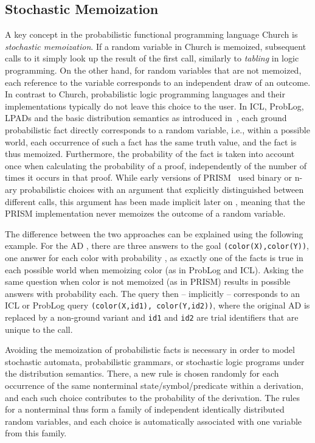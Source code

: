 \documentclass[a4paper]{article}
\begin{document}
\subsection{Stochastic Memoization}
\label{sec:repeat}
A key concept in the probabilistic functional programming language
Church \citep{Goodman08} is \emph{stochastic memoization}. If a random
variable in Church is memoized, subsequent calls to it simply look up
the result of the first call, similarly to \emph{tabling} in logic
programming. On the other hand, for random variables that are not
memoized, each reference to the variable corresponds to an independent
draw of an outcome. In contrast to Church,
probabilistic logic programming languages and their implementations typically do not leave this choice
to the user. 
In ICL, ProbLog, LPADs and the basic distribution semantics as introduced in~\citep{Sato:95}, 
each ground probabilistic fact directly corresponds to a
random variable, i.e., within a possible world, each occurrence of
such a fact has the same truth value, and the fact is thus memoized. Furthermore, the probability of
the fact is taken into account once when calculating the probability
of a proof, independently of the number of times it occurs in that
proof. 
While early versions of PRISM~\citep{Sato:95,sato:ijcai97} used binary or
n-ary probabilistic choices with an argument that explicitly
distinguished between different calls, this argument has been made
implicit later on \citep{SatoKameya:01}, meaning that the PRISM
implementation never memoizes the outcome of a random variable.  


The difference between the two approaches can be explained using the following 
example. 
For the AD , there are three answers to the
 goal \texttt{(color(X),color(Y))}, one answer  for each color
  with probability , as exactly one of the facts
  is true in each possible world when memoizing color (as in ProbLog and ICL). 
Asking the same question when color is not memoized (as in PRISM) results in  possible answers with
 probability  each. The query then -- implicitly --
 corresponds to an ICL or ProbLog query \texttt{(color(X,id1),
   color(Y,id2))}, where the original AD is replaced by a non-ground variant  and 
 \texttt{id1} and \texttt{id2} are trial identifiers that are unique
 to the call.

Avoiding the memoization of probabilistic facts is necessary in order to  
model stochastic automata, probabilistic grammars, or stochastic logic programs \citep{Muggleton:96} under the distribution semantics.
There, a new rule is chosen randomly for each occurrence of the same nonterminal state/symbol/predicate within a derivation, and each such choice contributes to the probability of the derivation. The rules for a nonterminal thus form a family of independent identically distributed random variables, and each choice is automatically associated with one variable from this family.
\end{document}
